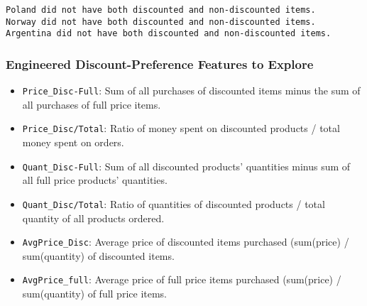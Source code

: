 \documentclass[11pt]{article}
\providecommand{\tightlist}{%
      \setlength{\itemsep}{0pt}\setlength{\parskip}{0pt}}
\begin{document}
    \begin{Verbatim}[commandchars=\\\{\}]
Poland did not have both discounted and non-discounted items.
Norway did not have both discounted and non-discounted items.
Argentina did not have both discounted and non-discounted items.

    \end{Verbatim}

    \hypertarget{engineered-discount-preference-features-to-explore}{%
\subsubsection{Engineered Discount-Preference Features to
Explore}\label{engineered-discount-preference-features-to-explore}}

\begin{itemize}
\tightlist
\item
  \texttt{Price\_Disc-Full}: Sum of all purchases of discounted items
  minus the sum of all purchases of full price items.
\item
  \texttt{Price\_Disc/Total}: Ratio of money spent on discounted
  products / total money spent on orders.
\item
  \texttt{Quant\_Disc-Full}: Sum of all discounted products' quantities
  minus sum of all full price products' quantities.
\item
  \texttt{Quant\_Disc/Total}: Ratio of quantities of discounted products
  / total quantity of all products ordered.
\item
  \texttt{AvgPrice\_Disc}: Average price of discounted items purchased
  (sum(price) / sum(quantity) of discounted items.
\item
  \texttt{AvgPrice\_full}: Average price of full price items purchased
  (sum(price) / sum(quantity) of full price items.
\end{itemize}
\end{document}
